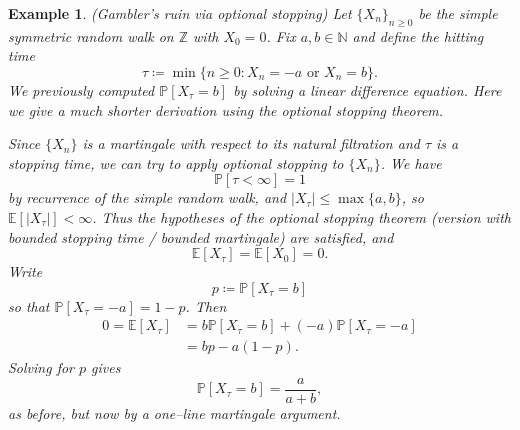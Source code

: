 \documentclass{tufte-handout}
\newcommand*\N{\mathbb{N}}
\newcommand*\Z{\mathbb{Z}}
\newcommand*\E{\mathbb{E}}
\renewcommand*\P{\mathbb{P}}
\newtheorem{ex}[thm]{Example}
\theoremstyle{definition}
\begin{document}
\begin{ex}
	(Gambler's ruin via optional stopping) Let $\{X_n\}_{n \ge 0}$ be the simple
	symmetric random walk on $\Z$ with $X_0 = 0$. Fix $a,b \in \N$ and define the
	hitting time
	\[
		\tau \coloneqq \min\{ n \ge 0 : X_n = -a \text{ or } X_n = b \}
	.\] 
	We previously computed $\P\left[ X_\tau = b \right]$ by solving a linear
	difference equation.
	Here we give a much shorter derivation using the optional stopping theorem.

	Since $\{X_n\}$ is a martingale with respect to its natural filtration and
	$\tau$ is a stopping time, we can try to apply optional stopping to $\{X_n\}$.
	We have
	\[
		\P\left[ \tau < \infty \right] = 1
	\]
	by recurrence of the simple random walk, and $|X_\tau| \le \max\{a,b\}$, so
	$\E\left[ \left| X_\tau \right| \right] < \infty$. Thus the hypotheses of the
	optional stopping theorem (version with bounded stopping time / bounded
	martingale) are satisfied, and
	\[
		\E\left[ X_\tau \right] = \E\left[ X_0 \right] = 0
	.\] 
	Write
	\[
		p \coloneqq \P\left[ X_\tau = b \right]
	\]
	so that $\P\left[ X_\tau = -a \right] = 1-p$. Then
	\begin{align*}
		0 = \E\left[X_\tau\right]
		&= b \P\left[ X_\tau = b \right] + (-a)\P\left[ X_\tau = -a \right] \\
		&= b p - a (1-p).
	\end{align*}
	Solving for $p$ gives
	\[
		\P\left[ X_\tau = b \right] = \frac{a}{a+b}
	,\]
	as before, but now by a one–line martingale argument.
\end{ex}
\end{document}
